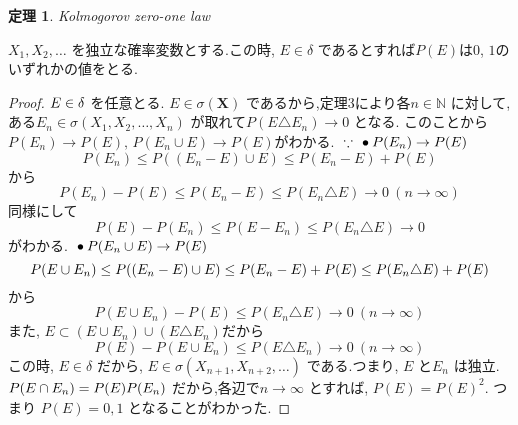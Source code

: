 \documentclass{jsarticle}
\newtheorem{thm}{定理}
\begin{document}
\begin{thm}
Kolmogorov zero-one law
\end{thm}

$X_{1},X_{2}, \dots$ を独立な確率変数とする.この時, $E\in\delta$ であるとすれば$P(E)$は$0$, $1$のいずれかの値をとる.

\begin{proof}
$\\  E \in \delta$ を任意とる. $E \in \sigma (\textbf {X})$ であるから,定理3により各$n \in \mathbb{N}$ に対して,
ある$E_{n} \in \sigma (X_{1}, X_{2}, \dots , X_{n})$ が取れて$P(E \triangle E_{n}) \to 0$ となる.
このことから$P(E_{n}) \to P(E), \, P(E_{n} \cup E) \to P(E)$がわかる.
$\\ \because $ 
$\\ \bullet P(E_{n}) \to P(E)\\$ $$
P(E_{n}) \le P((E_{n}-E) \cup E ) \le P(E_{n}-E) + P(E)$$から$$P(E_{n})-P(E) \le P(E_{n}-E) \le P(E_{n} \triangle E) \to 0 \ (n \to \infty)$$ 同様にして 
$$P(E)-P(E_{n}) \le P(E-E_{n}) \le P(E_{n} \triangle E) \to 0$$がわかる. 
$\\ \bullet P(E_{n} \cup E) \to P(E)$
$$\\ P(E \cup E_{n}) \le P((E_{n}-E) \cup E) \le P(E_{n}-E) + P(E) \le P(E_{n} \triangle E) + P(E)$$から
$$P(E \cup E_{n})-P(E) \le P(E_{n} \triangle E) \to 0 \ (n \to \infty)$$
また, $E \subset (E \cup E_{n}) \cup (E \triangle E_{n})$だから$$P(E)-P(E \cup E_{n}) \le P(E \triangle E_{n}) \to 0 \ (n \to \infty)$$
この時, $E \in \delta$ だから, $E \in \sigma (X_{n+1}, X_{n+2}, \dots)$ である.つまり, $E$ と$E_{n}$ は独立.
$\displaystyle \\ P(E \cap E_{n} ) = P(E)P( E_{n} )$ だから,各辺で$n \to \infty$ とすれば, $P(E) = P(E)^{2}$. つまり $P(E)=0,1$ となることがわかった.

\end{proof}
\end{document}
